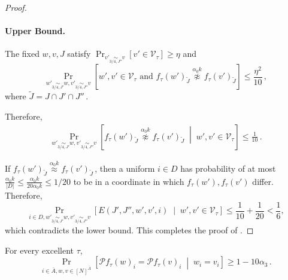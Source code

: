 \documentclass{toc}
\newcommand{\Prob}[2][]{\Pr_{{#1}}\left[#2\right]} %
\newcommand{\Brac}[1]{\left[#1\right]} %
\newcommand{\abs}[1]{\lvert#1\rvert} %
\newcommand{\given}{\;\middle\vert\;} %
\newcommand\f{f} %
\newcommand\bh{\mathcal{P}\f_\tau} %
\newcommand\neql[1]{\stackrel{{#1}}{ \approx}} %
\newcommand\neqg[1]{\stackrel{{#1}}{ \not\approx}} %
\newcommand\cons{\mathcal{V}} %
\newcommand\cor[1]{\underset{\scriptscriptstyle#1}{\sim}} %
\begin{document}
\begin{proof}
	\paragraph*{Upper Bound.}
	The fixed $w,v,J$ satisfy 
	$\Prob[v'\cor{3/4,J''} v]{v'\in \cons_\tau}\geq \eta$ and
	\[ \Prob[{w'\cor{3/4,J'}w,v'\cor{3/4,J''} v}] {w',v'\in \cons_\tau \textrm{ and } \f_\tau(w')_{\tilde{J}}\neqg{\alpha_0 k}\f_\tau(v')_{\tilde{J}}  }  \leq \frac{\eta^2}{10} \,,\]%
	where $\tilde{J}=J\cap J'\cap J''$\,.

	Therefore,
	\begin{align*}
	\Prob[{w'\cor{3/4,J'}w,v'\cor{3/4,J''} v}] { \f_\tau(w')_{\tilde{J}}\neqg{\alpha_0 k}\f_\tau(v')_{\tilde{J}}\given w',v'\in \cons_\tau}  \leq \frac{1}{10}\,.%
	\end{align*}
	
	If $\f_\tau(w')_{\tilde{J}}\neql{\alpha_0 k}\f_\tau(v')_{\tilde{J}}$\,, then a uniform $i\in D$ has probability of at most $\frac{\alpha_0 k}{\abs{D}} \leq \frac{\alpha_0 k}{20\alpha_0 k}\leq 
	1/20$ %
	 to be in a coordinate in which $\f_\tau(w'),\f_\tau(v')$ differ.
	Therefore,
	\[ \Prob[{i\in D,w'\cor{3/4,J'}w,v'\cor{3/4,J''} v}]{E(J',J'',w',v',i)\given w',v'\in\cons_\tau} \leq \frac{1}{10} + \frac{1}{20} < \frac{1}{6}, \]
	which contradicts the lower bound. This completes the proof of  .
\end{proof}

\begin{claim}\label{claim:local avg equality}
For every excellent $\tau$,
	\[ \Prob[i\in \bar{A}, w,v\in\Brac{N}^{\bar{A}}]{\bh(w)_i = \bh(v)_i \given w_i=v_i} \geq 1-10\alpha_3\,.\]
\end{claim}
\end{document}
